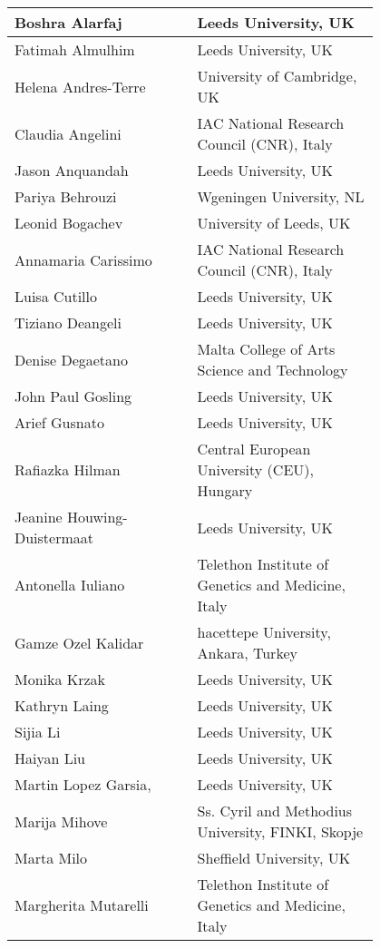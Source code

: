 \begin{center}
\begin{longtable}{p{0.4\linewidth} p{0.4\linewidth} }
\hline


Boshra	Alarfaj &	Leeds University, UK  \\ \hline
Fatimah	Almulhim	& Leeds University, UK  \\ \hline
Helena	Andres-Terre	& University of Cambridge, UK  \\ \hline
Claudia	Angelini &	IAC National Research Council (CNR), Italy  \\ \hline
Jason	Anquandah &	Leeds University, UK  \\ \hline
Pariya	Behrouzi	& Wgeningen University, NL  \\ \hline
Leonid	Bogachev	& University of Leeds, UK \\ \hline
Annamaria	Carissimo	& IAC National Research Council (CNR), Italy  \\ \hline
Luisa	Cutillo &	Leeds University, UK  \\ \hline
Tiziano	Deangeli	& Leeds University, UK  \\ \hline
Denise	Degaetano &	Malta College of Arts Science and Technology  \\ \hline
John Paul	Gosling	& Leeds University, UK  \\ \hline
Arief	Gusnato	& Leeds University, UK  \\ \hline
 Rafiazka	Hilman	& Central European University (CEU), Hungary  \\ \hline
Jeanine	Houwing-Duistermaat	& Leeds University, UK  \\ \hline
Antonella	Iuliano &	Telethon Institute of Genetics and Medicine, Italy  \\ \hline
Gamze Ozel	Kalidar	& hacettepe University, Ankara, Turkey  \\ \hline
Monika	Krzak	& Leeds University, UK  \\ \hline
Kathryn	Laing &	Leeds University, UK  \\ \hline
Sijia	Li &	Leeds University, UK  \\ \hline
Haiyan Liu & Leeds University, UK  \\ \hline
Martin Lopez Garsia, & Leeds University, UK  \\ \hline
Marija	Mihove	& Ss. Cyril and Methodius University, FINKI, Skopje  \\ \hline
Marta	Milo	& Sheffield University, UK  \\ \hline
Margherita	Mutarelli	& Telethon Institute of Genetics and Medicine, Italy  \\ \hline

\end{longtable}
\end{center}
